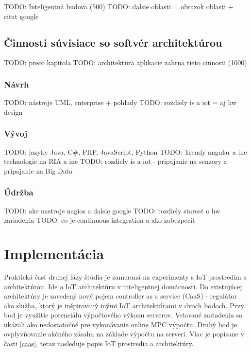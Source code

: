  
TODO: Inteligentná budova (500)
TODO: dalsie oblasti = obrazok oblasti + citat google

\subsection{Činnosti súvisiace so softvér architektúrou}
TODO: preco kapitola 
TODO: architektura aplikacie zahrna tieto cinnosti (1000)
\subsubsection{Návrh}
TODO: nástroje UML, enterprise + pohlady
TODO: rozdiely is a iot = aj hw design 
\subsubsection{Vývoj}
TODO: jazyky Java, C\#, PHP, JavaScript, Python
TODO: Trendy angular a ine technologie na RIA a ine 
TODO: rozdiely is a iot - pripajanie na senzory a pripajanie na Big Data
\subsubsection{Údržba}
TODO: ake nastroje nagios a dalsie google
TODO: rozdiely starost o hw zariadenia
TODO: co je continuous integration a ako zabezpecit


\section{Implementácia}
Praktická časť druhej fázy štúdia je zameraná na experimenty s IoT prostredím a architektúrou. Ide o IoT architektúru v inteligentnej domácnosti. Do existujúcej architektúry je zavedený nový pojem controller as a service (CaaS) - regulátor ako služba, ktorý je inšpirovaný inými IoT architektúrami v dvoch bodoch. Prvý bod je využitie potenciálu výpočtového výkonu serverov. Vstavané zariadenia sa ukázali ako nedostatočné pre vykonávanie online MPC výpočtu. Druhý bod je ovplyvňovanie akčného zásahu na základe výpočtu na serveri. Viac je popísane v časti \ref{caas}, teraz nasleduje popis IoT prostredia a architektúry.
